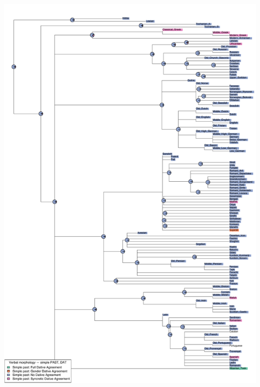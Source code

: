 \includegraphics[width=.9\linewidth]{supp-graphics/VerbalmorphologysimplePASTDATPSTDATAGRFULLVerbalmorphologysimplePASTDATPSTDATGenderAGRVerbalmorphologysimplePASTDATPSTNODATAGR.pdf}


